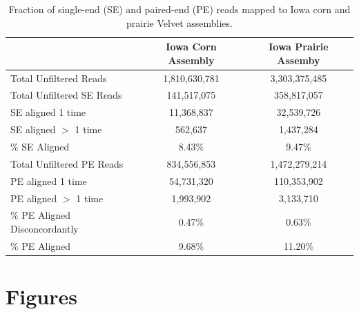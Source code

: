 \documentclass[11pt]{article} %
\begin{document}
\begin{table}[ht]
\caption{Fraction of single-end (SE) and paired-end (PE) reads mapped to Iowa corn and prairie Velvet assemblies.}
\begin{tabular}{l c c}
 & Iowa Corn Assembly & Iowa Prairie Assemby \\
 \hline
Total Unfiltered Reads	& 1,810,630,781	& 3,303,375,485\\
Total Unfiltered SE Reads &	141,517,075 &	358,817,057\\
SE aligned 1 time	& 11,368,837	& 32,539,726\\
SE aligned $>$ 1 time	& 562,637	& 1,437,284\\
\% SE Aligned & 	8.43\% &	9.47\% \\
Total Unfiltered PE Reads & 	834,556,853	& 1,472,279,214\\
PE aligned 1 time	& 54,731,320	& 110,353,902\\
PE aligned $>$ 1 time	&1,993,902	 & 3,133,710\\
\% PE Aligned Disconcordantly	 & 0.47\% &	 0.63\%\\
\% PE Aligned	& 9.68\%	& 11.20\%\\
\end{tabular}
\label{read-map}
\end{table}




\pagebreak
\section{Figures}
\end{document}
